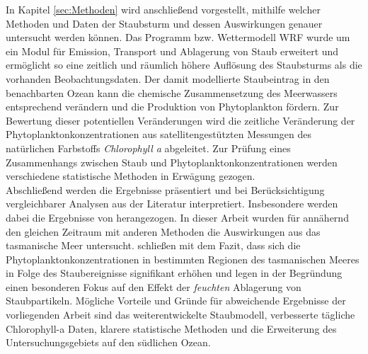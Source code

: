 \documentclass[12pt,a4paper,onecolumn,draft]{scrartcl}
\begin{document}
In Kapitel \ref{sec:Methoden} wird anschließend vorgestellt, mithilfe welcher Methoden und Daten der Staubsturm und dessen Auswirkungen genauer untersucht werden können. Das Programm bzw. Wettermodell WRF wurde um ein Modul für Emission, Transport und Ablagerung von Staub erweitert und ermöglicht so eine zeitlich und räumlich höhere Auflösung des Staubsturms als die vorhanden Beobachtungsdaten. Der damit modellierte Staubeintrag in den benachbarten Ozean kann die chemische Zusammensetzung des Meerwassers entsprechend verändern und die Produktion von Phytoplankton fördern. Zur Bewertung dieser potentiellen Veränderungen wird die zeitliche Veränderung der Phytoplanktonkonzentrationen aus satellitengestützten Messungen des natürlichen Farbstoffs \textit{Chlorophyll a} abgeleitet. Zur Prüfung eines Zusammenhangs zwischen Staub und Phytoplanktonkonzentrationen werden verschiedene statistische Methoden in Erwägung gezogen.\\

Abschließend werden die Ergebnisse präsentiert und bei Berücksichtigung vergleichbarer Analysen aus der Literatur interpretiert. Insbesondere werden dabei die Ergebnisse von \citet{Gabric.2016} herangezogen. In dieser Arbeit wurden  für annähernd den gleichen Zeitraum mit anderen Methoden die Auswirkungen aus das tasmanische Meer untersucht.  \citet{Gabric.2016} schließen mit dem Fazit, dass sich die Phytoplanktonkonzentrationen in bestimmten Regionen des tasmanischen Meeres in Folge des Staubereignisse signifikant erhöhen und legen in der Begründung einen besonderen Fokus auf den Effekt der  \textit{feuchten} Ablagerung von Staubpartikeln. Mögliche Vorteile und Gründe für abweichende Ergebnisse der vorliegenden Arbeit sind das weiterentwickelte Staubmodell, verbesserte tägliche Chlorophyll-a Daten, klarere statistische Methoden und die Erweiterung des Untersuchungsgebiets auf den südlichen Ozean.
\end{document}

